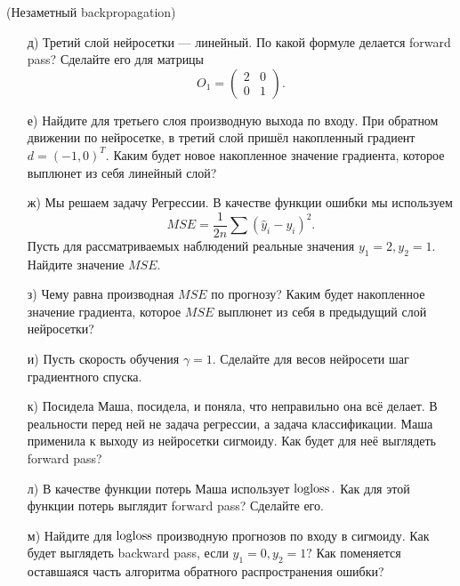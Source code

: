 \begin{problem}{(Незаметный backpropagation)}
\begin{enumerate}
		\item[д)] Третий слой нейросетки --- линейный.  По какой формуле делается forward pass? Сделайте его для матрицы \[O_1 =\begin{pmatrix} 2 & 0 \\ 0 & 1 \end{pmatrix}.\]  
		
		\item[е)] Найдите для третьего слоя производную выхода по входу. При обратном движении по нейросетке, в третий слой пришёл накопленный градиент $d = (-1, 0)^T$. Каким будет новое накопленное значение градиента, которое выплюнет из себя линейный слой? 

		\item[ж)] Мы решаем задачу Регрессии. В качестве функции ошибки мы используем \[MSE = \frac{1}{2n} \sum (\hat y_i - y_i)^2.\] Пусть для рассматриваемых наблюдений реальные значения  $y_1 = 2, y_2 = 1$. Найдите значение $MSE$.
		
		\item[з)] Чему равна производная $MSE$ по прогнозу? Каким будет накопленное значение градиента, которое $MSE$ выплюнет из себя в предыдущий слой нейросетки? 
		
		\item[и)] Пусть скорость обучения $\gamma = 1$.  Сделайте для весов нейросети шаг градиентного спуска. 
		
		\item[к)] Посидела Маша, посидела, и поняла, что неправильно она всё делает. В реальности перед ней не задача регрессии, а задача классификации. Маша применила к выходу из нейросетки сигмоиду. Как будет для неё выглядеть forward pass? 
		
		\item[л)] В качестве функции потерь Маша использует $\operatorname{logloss}.$ Как для этой функции потерь выглядит forward pass? Сделайте его. 
		
		\item[м)] Найдите для $\operatorname{logloss}$ производную прогнозов по входу в сигмоиду. Как будет выглядеть backward pass, если $y_1 = 0, y_2 = 1?$ Как поменяется оставшаяся часть алгоритма обратного распространения ошибки? 
	\end{enumerate}
\end{problem} 

